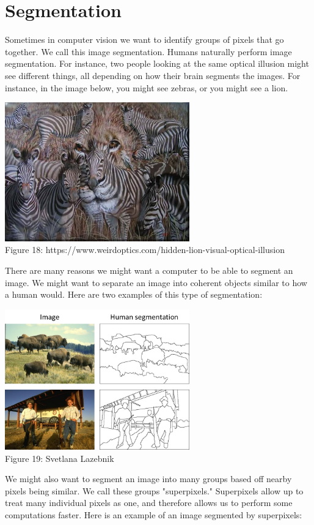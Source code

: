 \documentclass{article}
\begin{document}
\section{Segmentation}
Sometimes in computer vision we want to identify groups of pixels that go together. We call this image segmentation. Humans naturally perform image segmentation. For instance, two people looking at the same optical illusion might see different things, all depending on how their brain segments the images. For instance, in the image below, you might see zebras, or you might see a lion.
\begin{center}
\includegraphics[width=8cm]{lion.jpg} \\
Figure 18: https://www.weirdoptics.com/hidden-lion-visual-optical-illusion
\end{center}

There are many reasons we might want a computer to be able to segment  an image. We might want to separate an image into coherent objects similar to how a human would. Here are two examples of this type of segmentation:

\begin{center}
\includegraphics[width=8cm]{objects.png} \\
Figure 19:  Svetlana Lazebnik
\end{center}

We might also want to segment an image into many groups based off nearby pixels being similar. We call these groups "superpixels." Superpixels allow up to treat many individual pixels as one, and therefore allows us to perform some computations faster. Here is an example of an image segmented by superpixels:
\end{document}
